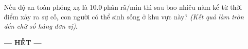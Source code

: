 \begin{ex}
	Nếu độ an toàn phóng xạ là $\SI{10.0}{\text{phân rã}/\minute}$ thì sau bao nhiêu năm kể từ thời điểm xảy ra sự cố, con người có thể sinh sống ở khu vực này? \textit{(Kết quả làm tròn đến chữ số hàng đơn vị)}.
	\loigiai{
		
	}
\end{ex}
\begin{center}
	\textbf{--- HẾT ---}
\end{center}
